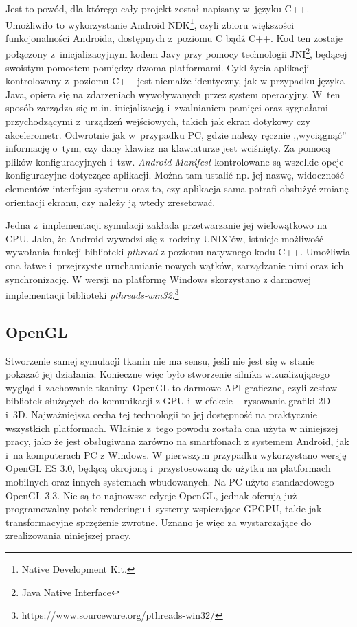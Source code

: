 		Jest to powód, dla którego cały projekt został napisany w~języku C++. Umożliwiło to wykorzystanie Android NDK\footnote{Native Development Kit.}, czyli zbioru większości funkcjonalności Androida, dostępnych z~poziomu C bądź C++. Kod ten zostaje połączony z~inicjalizacyjnym kodem Javy przy pomocy technologii JNI\footnote{Java Native Interface}, będącej swoistym pomostem pomiędzy dwoma platformami. Cykl życia aplikacji kontrolowany z~poziomu C++ jest niemalże identyczny, jak w przypadku języka Java, opiera się na zdarzeniach wywoływanych przez system operacyjny. W~ten sposób zarządza się m.in. inicjalizacją i~zwalnianiem pamięci oraz sygnałami przychodzącymi z~urządzeń wejściowych, takich jak ekran dotykowy czy akcelerometr. Odwrotnie jak w~przypadku PC, gdzie należy ręcznie ,,wyciągnąć'' informację o~tym, czy dany klawisz na klawiaturze jest wciśnięty. Za pomocą plików konfiguracyjnych i~tzw. \emph{Android Manifest} kontrolowane są wszelkie opcje konfiguracyjne dotyczące aplikacji. Można tam ustalić np. jej nazwę, widoczność elementów interfejsu systemu oraz to, czy aplikacja sama potrafi obsłużyć zmianę orientacji ekranu, czy należy ją wtedy zresetować.
		
		Jedna z~implementacji symulacji zakłada przetwarzanie jej wielowątkowo na CPU. Jako, że Android wywodzi się z~rodziny UNIX'ów, istnieje możliwość wywołania funkcji biblioteki \emph{pthread} z poziomu natywnego kodu C++. Umożliwia ona łatwe i~przejrzyste uruchamianie nowych wątków, zarządzanie nimi oraz ich synchronizację. W wersji na platformę Windows skorzystano z darmowej implementacji biblioteki \emph{pthreads-win32}.\footnote{https://www.sourceware.org/pthreads-win32/}
	
		\subsection{OpenGL}
		\label{t:technologie:narzedzia:ogl}
		
		
		Stworzenie samej symulacji tkanin nie ma sensu, jeśli nie jest się w stanie pokazać jej działania. Konieczne więc było stworzenie silnika wizualizującego wygląd i~zachowanie tkaniny. OpenGL to darmowe API graficzne, czyli zestaw bibliotek służących do komunikacji z GPU i~w efekcie -- rysowania grafiki 2D i~3D. Najważniejsza cecha tej technologii to jej dostępność na praktycznie wszystkich platformach. Właśnie z~tego powodu została ona użyta w niniejszej pracy, jako że jest obsługiwana zarówno na smartfonach z systemem Android, jak i~na komputerach PC z Windows. W pierwszym przypadku wykorzystano wersję OpenGL ES 3.0, będącą okrojoną i~przystosowaną do użytku na platformach mobilnych oraz innych systemach wbudowanych. Na PC użyto standardowego OpenGL 3.3. Nie są to najnowsze edycje OpenGL, jednak oferują już programowalny potok renderingu i~systemy wspierające GPGPU, takie jak transformacyjne sprzężenie zwrotne. Uznano je więc za wystarczające do zrealizowania niniejszej pracy.
		
